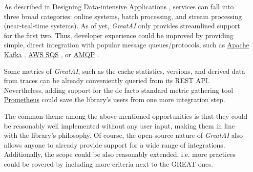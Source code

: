 As described in Designing Data-intensive Applications \cite{kleppmann2017designing}, services can fall into three broad categories: online systems, batch processing, and stream processing (near-teal-time systems). As of yet, \textit{GreatAI} only provides streamlined support for the first two. Thus, developer experience could be improved by providing simple, direct integration with popular message queues/protocols, such as \href{https://kafka.apache.org/}{Apache Kafka} \cite{kreps2011kafka}, \href{https://aws.amazon.com/sqs/}{AWS SQS} \cite{garfinkel2007evaluation}, or \href{https://www.amqp.org/}{AMQP} \cite{vinoski2006advanced}.

Some metrics of \textit{GreatAI}, such as the cache statistics, versions, and derived data from traces can be already conveniently queried from its REST API. Nevertheless, adding support for the de facto standard metric gathering tool \href{https://prometheus.io/}{Prometheus} could save the library's users from one more integration step.

The common theme among the above-mentioned opportunities is that they could be reasonably well implemented without any user input, making them in line with the library's philosophy. Of course, the open-source nature of \textit{GreatAI} also allows anyone to already provide support for a wide range of integrations. Additionally, the scope could be also reasonably extended, i.e. more practices could be covered by including more criteria next to the GREAT ones.
